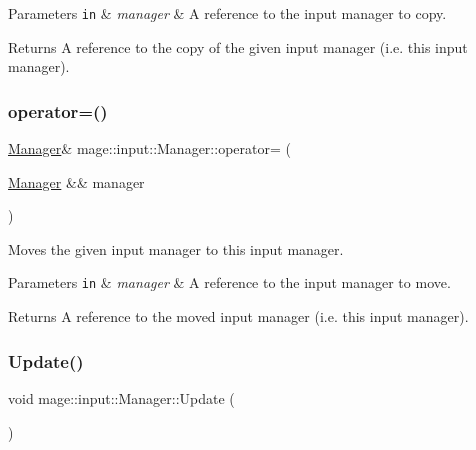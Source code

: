 \begin{DoxyParams}[1]{Parameters}
\mbox{\tt in}  & {\em manager} & A reference to the input manager to copy. \\
\hline
\end{DoxyParams}
\begin{DoxyReturn}{Returns}
A reference to the copy of the given input manager (i.\+e. this input manager). 
\end{DoxyReturn}
\hypertarget{classmage_1_1input_1_1_manager_a09047a5d857027368bc731763f8b5ece}{}\label{classmage_1_1input_1_1_manager_a09047a5d857027368bc731763f8b5ece} 
\subsubsection{\texorpdfstring{operator=()}{operator=()}\hspace{0.1cm}{\footnotesize\ttfamily [2/2]}}
{\footnotesize\ttfamily \hyperlink{classmage_1_1input_1_1_manager}{Manager}\& mage\+::input\+::\+Manager\+::operator= (\begin{DoxyParamCaption}\item[{\hyperlink{classmage_1_1input_1_1_manager}{Manager} \&\&}]{manager }\end{DoxyParamCaption})\hspace{0.3cm}{\ttfamily [delete]}}

Moves the given input manager to this input manager.


\begin{DoxyParams}[1]{Parameters}
\mbox{\tt in}  & {\em manager} & A reference to the input manager to move. \\
\hline
\end{DoxyParams}
\begin{DoxyReturn}{Returns}
A reference to the moved input manager (i.\+e. this input manager). 
\end{DoxyReturn}
\hypertarget{classmage_1_1input_1_1_manager_a89934adcb3da215d5162bd0d30e48a9d}{}\label{classmage_1_1input_1_1_manager_a89934adcb3da215d5162bd0d30e48a9d} 
\subsubsection{\texorpdfstring{Update()}{Update()}}
{\footnotesize\ttfamily void mage\+::input\+::\+Manager\+::\+Update (\begin{DoxyParamCaption}{ }\end{DoxyParamCaption})\hspace{0.3cm}{\ttfamily [noexcept]}}


